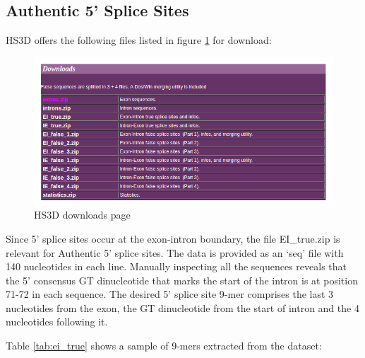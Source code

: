 \documentclass[12pt,a4paper]{article}
\begin{document}
	\subsection{Authentic 5' Splice Sites}
	HS3D offers the following files listed in figure \ref{fig:hs3d_download} for download:
   	\begin{figure}[H]
   		\includegraphics[width=\textwidth]{"hs3d_download"}
   		\caption{HS3D downloads page}
   		\centering
   		\label{fig:hs3d_download}
   	\end{figure}
	\par Since 5’ splice sites occur at the exon-intron boundary, the file EI\_true.zip is relevant for Authentic 5’ splice sites. The data is provided as an ‘seq’ file with 140 nucleotides in each line. Manually inspecting all the sequences reveals that the 5’ consensus GT dinucleotide that marks the start of the intron is at position 71-72 in each sequence. The desired 5’ splice site 9-mer comprises the last 3 nucleotides from the exon, the GT dinucleotide from the start of intron and the 4 nucleotides following it. \par
	Table \ref{tab:ei_true} shows a sample of 9-mers extracted from the dataset:
	
\end{document}
